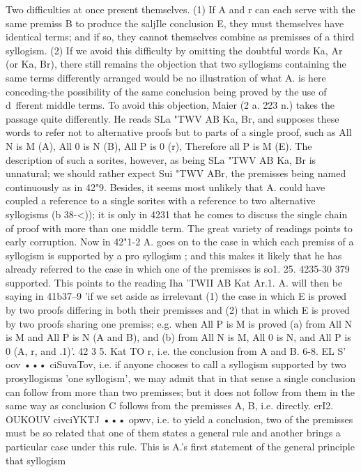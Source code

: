 {{{{{{{{{{{{{{{Two difficulties at once present themselves. (1) If A and r
can each serve with the same premiss B to produce the saljIle
conclusion E, they must themselves have identical terms; and
if so, they cannot themselves combine as premisses of a third
syllogism. (2) If we avoid this difficulty by omitting the doubtful
words Ka, Ar (or Ka, Br), there still remains the objection that
two syllogisms containing the same terms differently arranged
would be no illustration of what A. is here conceding-the
possibility of the same conclusion being proved by the use of
d~fferent middle terms. To avoid this objection, Maier (2 a. 223 n.)
takes the passage quite differently. He reads SLa "TWV AB Ka, Br,
and supposes these words to refer not to alternative proofs but
to parts of a single proof, such as All N is M (A), All 0 is N (B),
All P is 0 (r), Therefore all P is M (E). The description of such
a sorites, however, as being SLa "TWV AB Ka, Br is unnatural; we
should rather expect Sui "TWV ABr, the premisses being named
continuously as in 42"9. Besides, it seems most unlikely that A.
could have coupled a reference to a single sorites with a reference
to two alternative syllogisms (b 38-<)); it is only in 4231 that he
comes to discuss the single chain of proof with more than one
middle term.
The great variety of readings points to early corruption. Now
in 42"1-2 A. goes on to the case in which each premiss of a syllogism
is supported by a pro syllogism ; and this makes it likely that he
has already referred to the case in which one of the premisses is so1. 25. 4235-30
379
supported. This points to the reading Iha 'TWII AB Kat Ar.1. A.
will then be saying in 41b37--9 'if we set aside as irrelevant (1)
the case in which E is proved by two proofs differing in both their
premisses and (2) that in which E is proved by two proofs sharing
one premiss; e.g. when All P is M is proved (a) from All N is M
and All P is N (A and B), and (b) from All N is M, All 0 is N,
and All P is 0 (A, r, and .1)'.
42 3 5. Kat TO r, i.e. the conclusion from A and B.
6-8. EL S' oov ••• ciSuvaTov, i.e. if anyone chooses to call a
syllogism supported by two prosyllogisms 'one syllogism', we
may admit that in that sense a single conclusion can follow from
more than two premisses; but it does not follow from them in
the same way as conclusion C follows from the premisses A, B,
i.e. directly.
erI2. OUKOUV civciYKTJ ••• opwv, i.e. to yield a conclusion, two
of the premisses must be so related that one of them states a
general rule and another brings a particular case under this rule.
This is A.'s first statement of the general principle that syllogism
}}}}}}}}}}}}}}}
